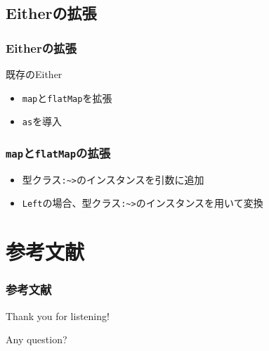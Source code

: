 \subsection{Eitherの拡張}
\begin{frame}[fragile]
  \frametitle{Eitherの拡張}

  \begin{block}{既存のEither}
    
  \end{block}


  \begin{itemize}
    \item<3-> \lstinline|map|と\lstinline|flatMap|を拡張
    \item<4-> \lstinline|as|を導入
  \end{itemize}
\end{frame}

\begin{frame}[fragile]
  \frametitle{\lstinline|map|と\lstinline|flatMap|の拡張}


  \begin{itemize}
    \item<3-> 型クラス\lstinline|:~>|のインスタンスを引数に追加
    \item<4-> \lstinline|Left|の場合、型クラス\lstinline|:~>|のインスタンスを用いて変換
  \end{itemize}
\end{frame}
                                         
\section*{参考文献}
\begin{frame}
  \frametitle{参考文献}

  \nocite{*}
  
  
\end{frame}

\begin{frame}
  \tableofcontents
\end{frame}

\begin{frame}
  \centering
  {\Huge Thank you for listening!}

  \quad

  {\Huge Any question?}
\end{frame}


